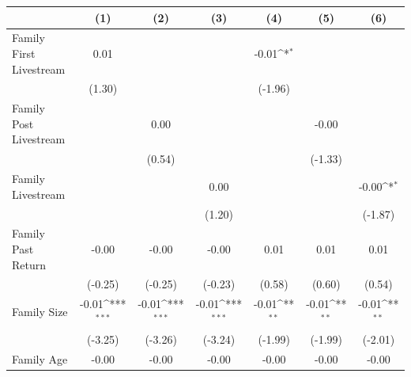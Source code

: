 {
\def\sym#1{\ifmmode^{#1}\else\(^{#1}\)\fi}
\begin{tabular}{l*{6}{c}}
\toprule
                    &\multicolumn{1}{c}{(1)}         &\multicolumn{1}{c}{(2)}         &\multicolumn{1}{c}{(3)}         &\multicolumn{1}{c}{(4)}         &\multicolumn{1}{c}{(5)}         &\multicolumn{1}{c}{(6)}         \\
\midrule
Family First Livestream&        0.01         &                     &                     &       -0.01\sym{*}  &                     &                     \\
                    &      (1.30)         &                     &                     &     (-1.96)         &                     &                     \\
\addlinespace
Family Post Livestream&                     &        0.00         &                     &                     &       -0.00         &                     \\
                    &                     &      (0.54)         &                     &                     &     (-1.33)         &                     \\
\addlinespace
Family Livestream   &                     &                     &        0.00         &                     &                     &       -0.00\sym{*}  \\
                    &                     &                     &      (1.20)         &                     &                     &     (-1.87)         \\
\addlinespace
Family Past Return  &       -0.00         &       -0.00         &       -0.00         &        0.01         &        0.01         &        0.01         \\
                    &     (-0.25)         &     (-0.25)         &     (-0.23)         &      (0.58)         &      (0.60)         &      (0.54)         \\
\addlinespace
Family Size         &       -0.01\sym{***}&       -0.01\sym{***}&       -0.01\sym{***}&       -0.01\sym{**} &       -0.01\sym{**} &       -0.01\sym{**} \\
                    &     (-3.25)         &     (-3.26)         &     (-3.24)         &     (-1.99)         &     (-1.99)         &     (-2.01)         \\
\addlinespace
Family Age          &       -0.00         &       -0.00         &       -0.00         &       -0.00         &       -0.00         &       -0.00         \\

\end{tabular}}
